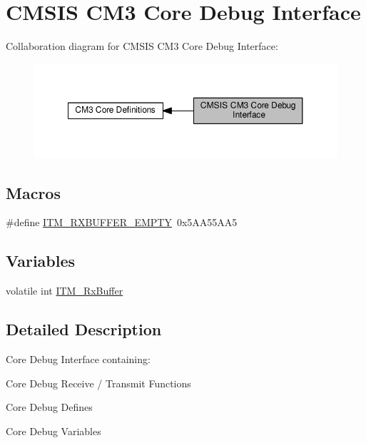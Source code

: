 \hypertarget{group__CMSIS__CM3__CoreDebugInterface}{}\section{C\+M\+S\+IS C\+M3 Core Debug Interface}
\label{group__CMSIS__CM3__CoreDebugInterface}
Collaboration diagram for C\+M\+S\+IS C\+M3 Core Debug Interface\+:\nopagebreak
\begin{figure}[H]
\begin{center}
\leavevmode
\includegraphics[width=350pt]{da/dd6/group__CMSIS__CM3__CoreDebugInterface}
\end{center}
\end{figure}
\subsection*{Macros}
\begin{DoxyCompactItemize}
\item 
\#define \hyperlink{group__CMSIS__CM3__CoreDebugInterface_gaa822cb398ee022b59e9e6c5d7bbb228a}{I\+T\+M\+\_\+\+R\+X\+B\+U\+F\+F\+E\+R\+\_\+\+E\+M\+P\+TY}~0x5\+A\+A55\+A\+A5
\end{DoxyCompactItemize}
\subsection*{Variables}
\begin{DoxyCompactItemize}
\item 
volatile int \hyperlink{group__CMSIS__CM3__CoreDebugInterface_gacf1fe3063cedf11b6e6f7cb0dd7c1a51}{I\+T\+M\+\_\+\+Rx\+Buffer}
\end{DoxyCompactItemize}


\subsection{Detailed Description}
Core Debug Interface containing\+:
\begin{DoxyItemize}
\item Core Debug Receive / Transmit Functions
\item Core Debug Defines
\item Core Debug Variables 
\end{DoxyItemize}


